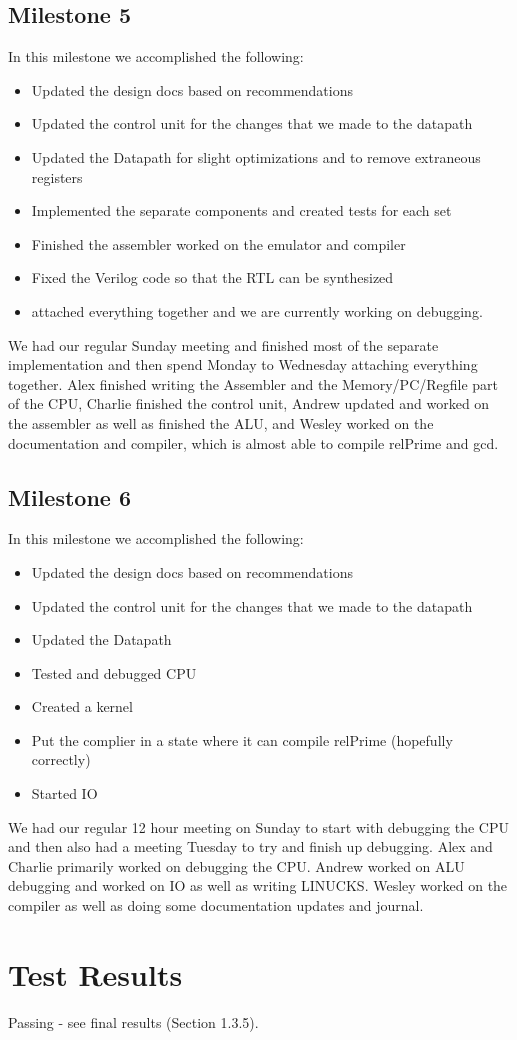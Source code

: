 \documentclass{report}
\begin{document}
	\section{Milestone 5}
		In this milestone we accomplished the following:
		\begin{itemize}
			\item Updated the design docs based on recommendations
			\item Updated the control unit for the changes that we made to the datapath
			\item Updated the Datapath for slight optimizations and to remove extraneous registers
			\item Implemented the separate components and created tests for each set
			\item Finished the assembler worked on the emulator and compiler
			\item Fixed the Verilog code so that the RTL can be synthesized
			\item attached everything together and we are currently working on debugging.
		\end{itemize}
		We had our regular Sunday meeting and finished most of the separate implementation and then spend Monday to Wednesday attaching everything together. Alex finished writing the Assembler and the Memory/PC/Regfile part of the CPU, Charlie finished the control unit, Andrew updated and worked on the assembler as well as finished the ALU, and Wesley worked on the documentation and compiler, which is almost able to compile relPrime and gcd.
	\section{Milestone 6}
		In this milestone we accomplished the following:
		\begin{itemize}
			\item Updated the design docs based on recommendations
			\item Updated the control unit for the changes that we made to the datapath
			\item Updated the Datapath
			\item Tested and debugged CPU
			\item Created a kernel
			\item Put the complier in a state where it can compile relPrime (hopefully correctly)
			\item Started IO
		\end{itemize}
		We had our regular 12 hour meeting on Sunday to start with debugging the CPU and then also had a meeting Tuesday to try and finish up debugging.  Alex and Charlie primarily worked on debugging the CPU.  Andrew worked on ALU debugging and worked on IO as well as writing LINUCKS.  Wesley worked on the compiler as well as doing some documentation updates and journal.
\chapter{Test Results}
	Passing - see final results (Section 1.3.5).
\end{document}
